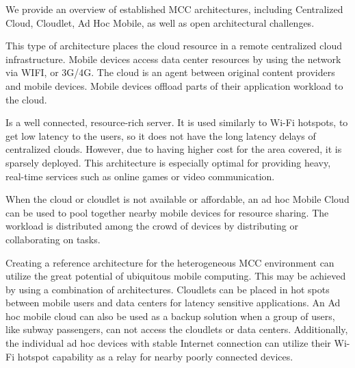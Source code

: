We provide an overview of established MCC architectures, including Centralized Cloud, Cloudlet, Ad Hoc Mobile, as well as open architectural challenges.
\begin{description}[style=nextline]
\item [Centralized Cloud]
This type of architecture places the cloud resource in a remote centralized cloud infrastructure\cite[p.3]{liu2013gearing}. Mobile devices access data center resources by using the network via WIFI, or 3G/4G. The cloud is an agent between original content providers and mobile devices. Mobile devices offload parts of their application workload to the cloud.
\item [Cloudlet]
Is a well connected, resource-rich server\cite[p.3-4]{liu2013gearing}. 
It is used similarly to Wi-Fi hotspots, to get low latency to the users, so it does not have the long latency delays of centralized clouds. 
However, due to having higher cost for the area covered, it is sparsely deployed. 
This architecture is especially optimal for providing heavy, real-time services such as online games or video communication.
\item [ad hoc Mobile Cloud]
When the cloud or cloudlet is not available or affordable, an ad hoc Mobile Cloud can be used to pool together nearby mobile devices for resource sharing\cite[p.4]{liu2013gearing}. 
The workload is distributed among the crowd of devices by distributing or collaborating on tasks.
\item [Architectural Challenges]
Creating a reference architecture for the heterogeneous MCC environment can utilize the great potential of ubiquitous mobile computing\cite{sanaei2014heterogeneity}. 
This may be achieved by using a combination of architectures. 
Cloudlets can be placed in hot spots between mobile users and data centers for latency sensitive applications. 
An Ad hoc mobile cloud can also be used as a backup solution when a group of users, like subway passengers, can not access the cloudlets or data centers. 
Additionally, the individual ad hoc devices with stable Internet connection can utilize their Wi-Fi hotspot capability as a relay for nearby poorly connected devices.


\end{description}